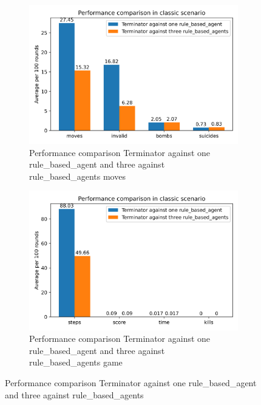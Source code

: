 \documentclass[
	letterpaper, %
	12pt, %
]{CSUniSchoolLabReport}
\begin{document}
\begin{figure}[H]

	\begin{subfigure}{\textwidth}
		\centering
		\includegraphics[scale=0.6]{Figures/Task4-1.png}
		\caption{Performance comparison Terminator against one rule\_based\_agent and three against rule\_based\_agents moves}
		\label{img:Task4-1}
	\end{subfigure}

	\begin{subfigure}{\textwidth}
		\centering
		\includegraphics[scale=0.6]{Figures/Task4-2.png}
		\caption{Performance comparison Terminator against one rule\_based\_agent and three against rule\_based\_agents game}
		\label{img:Task4-2}
	\end{subfigure}

	\caption{Performance comparison Terminator against one rule\_based\_agent and three against rule\_based\_agents}
	\label{img:Task4}

\end{figure}
\end{document}
